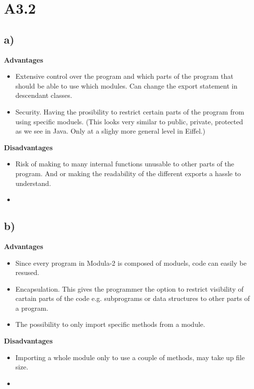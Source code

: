 \section{A3.2}
\subsection{a)}

\textbf{Advantages}
\begin{itemize}
    \item Extensive control over the program and which parts of the program
    that should be able to use which modules. Can change the export statement in descendant classes.
    \item Security. Having the prosibility to restrict certain parts of the program
    from using specific moduels. (This looks very similar to public, private, protected as we see in Java. Only
    at a slighy more general level in Eiffel.)
\end{itemize}

\noindent\textbf{Disadvantages}
\begin{itemize}
    \item Risk of making to many internal functions unusable to other parts of the
    program. And or making the readability of the different exports a hassle to understand.
    \item 
\end{itemize}

\subsection{b)}

\textbf{Advantages}
\begin{itemize}
    \item Since every program in Modula-2 is composed of moduels, code can easily be resused.
    \item Encapsulation. This gives the programmer the option to restrict visibility of cartain
    parts of the code e.g. subprograms or data structures to other parts of a program.
    \item The possibility to only import specific methods from a module.
\end{itemize}

\noindent\textbf{Disadvantages}
\begin{itemize}
    \item Importing a whole module only to use a couple of methods, may take up file size.
    \item 
\end{itemize}